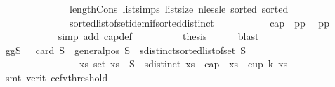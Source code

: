 \begin{isabellebody}
\ \ \ \ \ \ \ \ \ \ \ \ \ \ length{\isacharunderscore}{\kern0pt}Cons\ list{\isachardot}{\kern0pt}simps{\isacharparenleft}{\kern0pt}{}{}{\isacharparenright}{\kern0pt}\ list{\isachardot}{\kern0pt}size{\isacharparenleft}{\kern0pt}{}{\isacharparenright}{\kern0pt}\ nless{\isacharunderscore}{\kern0pt}le\ sorted{}\ sorted{}\isanewline
\ \ \ \ \ \ \ \ \ \ \ \ \ \ sorted{\isacharunderscore}{\kern0pt}list{\isacharunderscore}{\kern0pt}of{\isacharunderscore}{\kern0pt}set{\isachardot}{\kern0pt}idem{\isacharunderscore}{\kern0pt}if{\isacharunderscore}{\kern0pt}sorted{\isacharunderscore}{\kern0pt}distinct{\isacharparenright}{\kern0pt}\isanewline
\ \ \ \ \ \ \ \ \isamarkupfalse%
\ {}{\isacharcolon}{\kern0pt}\ {\isachardoublequoteopen}cap\ {}\ {\isacharbrackleft}{\kern0pt}p{}{\isacharcomma}{\kern0pt}p{}{\isacharbrackright}{\kern0pt}{\isachardoublequoteclose}\ \isamarkupfalse%
\ p{}p{}{\isacharparenleft}{\kern0pt}{}{\isacharparenright}{\kern0pt}\isanewline
\ \ \ \ \ \ \ \ \ \ \isamarkupfalse%
\ {\isacharparenleft}{\kern0pt}simp\ add{\isacharcolon}{\kern0pt}\ cap{\isacharunderscore}{\kern0pt}def{\isacharparenright}{\kern0pt}\isanewline
\ \ \ \ \ \ \ \ \isamarkupfalse%
\ {\isacharquery}{\kern0pt}thesis\ \isamarkupfalse%
\ {}\ {}\ \isamarkupfalse%
\ blast\isanewline
\ \ \ \ \ \ \isamarkupfalse%
\isanewline
\ \ \ \ \isakeywordONE{{\isacharbraceright}{\kern0pt}}\isamarkupfalse%
\isanewline
\ \ \ \ \isamarkupfalse%
\ gg{\isacharcolon}{\kern0pt}{\isachardoublequoteopen}{\isasymforall}S{\isachardot}{\kern0pt}\ {}\ {\isasymle}\ card\ S\ {\isasymand}\ general{\isacharunderscore}{\kern0pt}pos\ S\ {\isasymand}\ sdistinct{\isacharparenleft}{\kern0pt}sorted{\isacharunderscore}{\kern0pt}list{\isacharunderscore}{\kern0pt}of{\isacharunderscore}{\kern0pt}set\ S{\isacharparenright}{\kern0pt}\ {\isasymlongrightarrow}\isanewline
\ \ \ \ \ \ \ \ \ \ \ \ \ \ \ \ {\isacharparenleft}{\kern0pt}{\isasymexists}xs{\isachardot}{\kern0pt}\ set\ xs\ {\isasymsubseteq}\ S\ {\isasymand}\ sdistinct\ xs\ {\isasymand}\ {\isacharparenleft}{\kern0pt}cap\ {}\ xs\ {\isasymor}\ cup\ k\ xs{\isacharparenright}{\kern0pt}{\isacharparenright}{\kern0pt}{\isachardoublequoteclose}\isanewline
\ \ \ \ \ \ \isamarkupfalse%
\ {\isacharparenleft}{\kern0pt}smt\ {\isacharparenleft}{\kern0pt}verit{\isacharcomma}{\kern0pt}\ ccfv{\isacharunderscore}{\kern0pt}threshold{\isacharparenright}{\kern0pt}\isanewline

\end{isabellebody}
